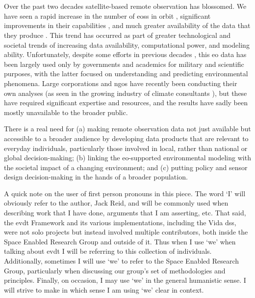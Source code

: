 \chapter{}
Over the past two decades satellite-based remote observation has blossomed. We have seen a rapid increase in the number of \acp{eos} in orbit \cite{belwardWhoLaunchedWhat2015}, significant improvements in their capabilities \cite{jensenRemoteSensingEnvironment2006}, and much greater availability of the data that they produce \cite{borowitzOpenSpaceGlobal2017}. This trend has occurred as part of greater technological and societal trends of increasing data availability, computational power, and modeling ability. Unfortunately, despite some efforts in previous decades \cite{lightWarfareWelfareDefense2005}, this \ac{eo} data has been largely used only by governments and academics for military and scientific purposes, with the latter focused on understanding and predicting environmental phenomena. Large corporations and \acp{ngo} have recently been conducting their own analyses (as seen in the growing industry of climate consultants \cite{cohenTop10Climate2011}), but these have required significant expertise and resources, and the results have sadly been mostly unavailable to the broader public. 

There is a real need for (a) making remote observation data not just available but accessible to a broader audience by developing data products that are relevant to everyday individuals, particularly those involved in local, rather than national or global decision-making; (b) linking the \ac{eo}-supported environmental modeling with the societal impact of a changing environment; and (c) putting policy and sensor design decision-making in the hands of a broader population. 

A quick note on the user of first person pronouns in this piece. The word `I' will obviously refer to the author, Jack Reid, and will be commonly used when describing work that I have done, arguments that I am asserting, etc. That said, the \ac{evdt} Framework and its various implementations, including the Vida \ac{dss}, were not solo projects but instead involved multiple contributors, both inside the Space Enabled Research Group and outside of it. Thus when I use `we' when talking about \ac{evdt} I will be referring to this collection of individuals. Additionally, sometimes I will use `we' to refer to the Space Enabled Research Group, particularly when discussing our group's set of methodologies and principles. Finally, on occasion, I may use `we' in the general humanistic sense. I will strive to make in which sense I am using `we' clear in context.

